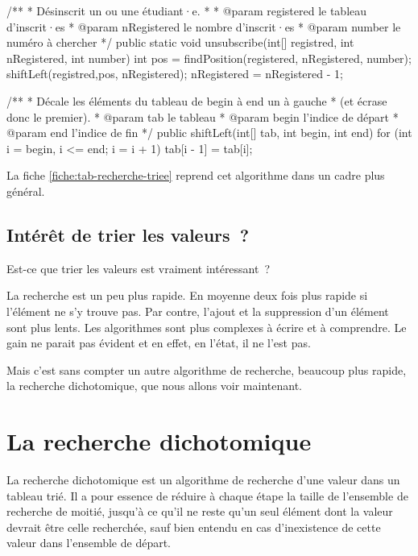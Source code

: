 			\begin{java}
/**
 * Désinscrit un ou une étudiant·e.
 * 
 * @param registered le tableau d'inscrit·es
 * @param nRegistered le nombre d'inscrit·es
 * @param number le numéro à chercher
 */
public static void unsubscribe(int[] registred, int nRegistered,
				int number){
	int pos = findPosition(registered, nRegistered, number);
	shiftLeft(registred,pos, nRegistered);
	nRegistered = nRegistered - 1;
}

/**
 * Décale les éléments du tableau de begin à end un à gauche
 * (et écrase donc le premier).
 * @param tab le tableau
 * @param begin l'indice de départ
 * @param end l'indice de fin
 */
public shiftLeft(int[] tab, int begin, int end){
	for (int i = begin, i <= end; i = i + 1){
		tab[i - 1] = tab[i];
	}
}
			\end{java}
			
			La fiche \vref{fiche:tab-recherche-triee} reprend cet algorithme
			dans un cadre plus général.

		\subsection{Intérêt de trier les valeurs~?}

			Est-ce que trier les valeurs est vraiment intéressant~?
			
			La recherche est un peu plus rapide. En moyenne deux fois plus
			rapide si l'élément ne s'y trouve pas. Par contre, l'ajout et la
			suppression d'un élément sont plus lents.  Les algorithmes sont plus
			complexes à écrire et à comprendre.  Le gain ne parait pas évident
			et en effet, en l’état, il ne l’est pas.
			
			Mais c’est sans compter un autre algorithme de recherche, beaucoup
			plus rapide, la recherche dichotomique, que nous allons voir
			maintenant.
			
	\section{La recherche dichotomique} 
	\label{chap:recherche-dichotomique}

		La recherche dichotomique est un algorithme de recherche d’une valeur
		dans un tableau trié.  Il a pour essence de réduire à chaque étape la
		taille de l’ensemble de recherche de moitié, jusqu’à ce qu’il ne reste
		qu’un seul élément dont la valeur devrait être celle recherchée, sauf
		bien entendu en cas d’inexistence de cette valeur dans l’ensemble de
		départ. 
	
